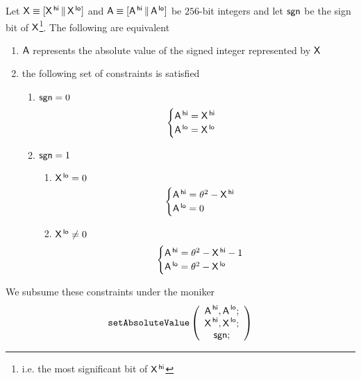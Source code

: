 \begin{lem}
	Let
	$\mathsf{X} \equiv [\mathsf{X}^{\mathsf{\,hi}} \,\|\, \mathsf{X}^{\mathsf{\,lo}}]$ and
	$\mathsf{A} \equiv [\mathsf{A}^{\mathsf{\,hi}} \,\|\, \mathsf{A}^{\mathsf{\,lo}}]$ be $256$-bit integers and let $\mathsf{sgn}$ be the sign bit of $\mathsf{X}$\footnote{i.e. the most significant bit of $\mathsf{X}^{\mathsf{\,hi}}$}. The following are equivalent
	\begin{enumerate}
		\item $\mathsf{A}$ represents the absolute value of the signed integer represented by $\mathsf{X}$
		\item the following set of constraints is satisfied
			\begin{enumerate}
				\item \If $\mathsf{sgn} = 0$ \Then
					\[
						\begin{cases}
							\mathsf{A}^{\mathsf{\,hi}} = \mathsf{X}^{\mathsf{\,hi}} \\
							\mathsf{A}^{\mathsf{\,lo}} = \mathsf{X}^{\mathsf{\,lo}} \\
						\end{cases}
					\]
				\item \If $\mathsf{sgn} = 1$ \Then
					\begin{enumerate}
						\item \If $\mathsf{X}^{\mathsf{\,lo}} = 0$
							\[
								\begin{cases}
									\mathsf{A}^{\mathsf{\,hi}} = \theta^2 - \mathsf{X}^{\mathsf{\,hi}} \\
									\mathsf{A}^{\mathsf{\,lo}} = 0 \\
								\end{cases}
							\]
						\item \If $\mathsf{X}^{\mathsf{\,lo}} \neq 0$
							\[
								\begin{cases}
									\mathsf{A}^{\mathsf{\,hi}} = \theta^2 - \mathsf{X}^{\mathsf{\,hi}} - 1 \\
									\mathsf{A}^{\mathsf{\,lo}} = \theta^2 - \mathsf{X}^{\mathsf{\,lo}} \\
								\end{cases}
							\]
					\end{enumerate}
			\end{enumerate}
	\end{enumerate}
\end{lem}
We subsume these constraints under the moniker
\[
	\texttt{setAbsoluteValue}
	\left( \begin{array}{c}
		\textsf{A}^{\mathsf{\,hi}}, \textsf{A}^{\mathsf{\,lo}}; \\
		\textsf{X}^{\mathsf{\,hi}}, \textsf{X}^{\mathsf{\,lo}}; \\
		\textsf{sgn};                 \\
	\end{array} \right)
\]
